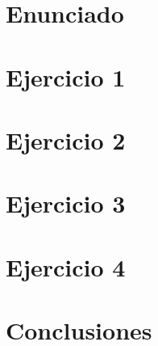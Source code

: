 \documentclass[10pt,a4paper]{article}
\begin{document}
		
	\setcounter{page}{1}

	\section{Enunciado}\label{sec:enunciado}
		

	\section{Ejercicio 1}\label{sec:ej1}
		
		
	\section{Ejercicio 2}\label{sec:ej2}
		

	\section{Ejercicio 3}\label{sec:ej3}
		

	\section{Ejercicio 4}\label{sec:ej4}
		

	\section{Conclusiones}\label{sec:conclusiones}
		

\end{document}
